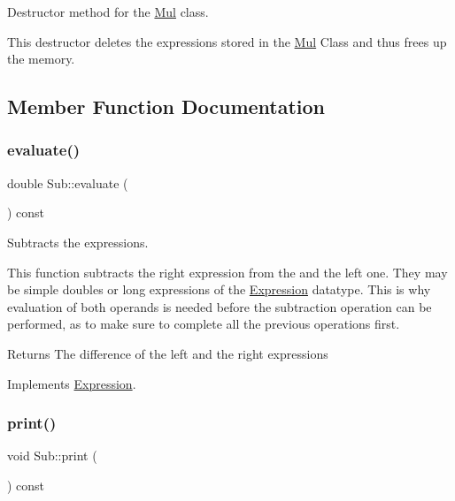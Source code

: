 Destructor method for the \hyperlink{class_mul}{Mul} class. 

This destructor deletes the expressions stored in the \hyperlink{class_mul}{Mul} Class and thus frees up the memory. 

\subsection{Member Function Documentation}
\mbox{\label{class_sub_a15b87b081136f533a993a92ac01ec11b}} 
\subsubsection{\texorpdfstring{evaluate()}{evaluate()}}
{\footnotesize\ttfamily double Sub\+::evaluate (\begin{DoxyParamCaption}{ }\end{DoxyParamCaption}) const\hspace{0.3cm}{\ttfamily [virtual]}}



Subtracts the expressions. 

This function subtracts the right expression from the and the left one. They may be simple doubles or long expressions of the \hyperlink{class_expression}{Expression} datatype. This is why evaluation of both operands is needed before the subtraction operation can be performed, as to make sure to complete all the previous operations first.

\begin{DoxyReturn}{Returns}
The difference of the left and the right expressions 
\end{DoxyReturn}


Implements \hyperlink{class_expression_a7437adfabeaeb0500d62d10c43a1f853}{Expression}.

\mbox{\label{class_sub_a2e7c967c1fdee5e7eca51ca36feb26bc}} 
\subsubsection{\texorpdfstring{print()}{print()}}
{\footnotesize\ttfamily void Sub\+::print (\begin{DoxyParamCaption}{ }\end{DoxyParamCaption}) const\hspace{0.3cm}{\ttfamily [virtual]}}




